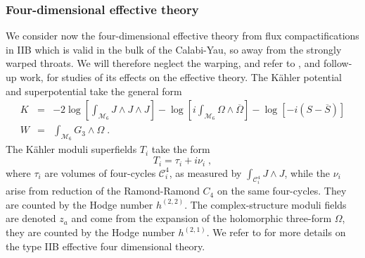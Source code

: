 \documentclass[11pt,a4paper]{article}
\numberwithin{equation}{section}
\numberwithin{table}{section}\setlength{\multlinegap}{25pt}
\newcommand{\bea}{\begin{eqnarray}}  \newcommand{\eea}{\end{eqnarray}}
\newcommand{\nn}{\nonumber}
\newcommand{\cC}{\mathcal{C}}
\newcommand{\cM}{\mathcal M}
\newcommand{\be}{\begin{equation}}
\newcommand{\ee}{\end{equation}}
\begin{document}
\subsubsection{Four-dimensional effective theory}
\label{sec:4dnoscale}

We consider now the four-dimensional effective theory from flux compactifications in IIB which is valid in the bulk of the Calabi-Yau, so away from the strongly warped throats. We will therefore neglect the warping, and refer to \cite{Giddings:2005ff}, and follow-up work, for studies of its effects on the effective theory. The K{\"a}hler potential and superpotential take the general form \cite{Gukov:1999ya,Giddings:2001yu,Grimm:2004uq}
\bea
\label{iibkw}
K &=& -2\log \left[ \int_{\cM_6} J \wedge J \wedge J \right] - \log \left[ i \int_{\cM_6} \Omega \wedge \overline{\Omega} \right] - \log\left[ -i\left( S - \overline{S} \right) \right] \nn \\  
W &=& \int_{\cM_6} G_3 \wedge \Omega \;.
\eea
The K{\"a}hler moduli superfields $T_i$ take the form
\be
T_i = \tau_i + i \nu_i  \;,
\ee
where $\tau_i$ are volumes of four-cycles $\cC^4_i$, as measured by $\int_{\cC^4_i} J \wedge J$, while the $\nu_i$ arise from reduction of the Ramond-Ramond $C_4$ on the same four-cycles. They are counted by the Hodge number $h^{(2,2)}$. The complex-structure moduli fields are denoted $z_a$ and come from the expansion of the holomorphic three-form $\Omega$, they are counted by the Hodge number $h^{(2,1)}$. We refer to \cite{Grimm:2004uq,Jockers:2004yj,Grimm:2005fa,Conlon:2006gv} for more details on the type IIB effective four dimensional theory.  
\end{document}
